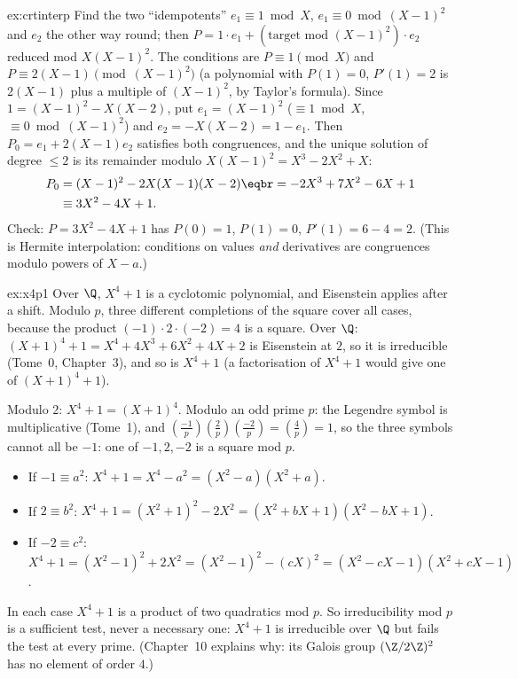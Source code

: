 \begin{solution}{ex:crtinterp}
\idea Find the two ``idempotents'' $e_1\equiv1\bmod X$, $e_1\equiv0\bmod(X-1)^2$ and $e_2$ the other way round; then $P=1\cdot e_1+(\text{target mod }(X-1)^2)\cdot e_2$ reduced mod $X(X-1)^2$.
\writeup The conditions are $P\equiv1\pmod X$ and $P\equiv2(X-1)\pmod{(X-1)^2}$ (a polynomial with $P(1)=0$, $P'(1)=2$ is $2(X-1)$ plus a multiple of $(X-1)^2$, by Taylor's formula). Since $1=(X-1)^2-X(X-2)$, put $e_1=(X-1)^2$ ($\equiv1\bmod X$, $\equiv0\bmod(X-1)^2$) and $e_2=-X(X-2)=1-e_1$. Then $P_0=e_1+2(X-1)e_2$ satisfies both congruences, and the unique solution of degree $\le2$ is its remainder modulo $X(X-1)^2=X^3-2X^2+X$:
\[
\begin{aligned}P_0&=(X-1)^2-2X(X-1)(X-2)\eqbr=-2X^3+7X^2-6X+1\\&\equiv3X^2-4X+1.\end{aligned}
\]
Check: $P=3X^2-4X+1$ has $P(0)=1$, $P(1)=0$, $P'(1)=6-4=2$. (This is Hermite interpolation: conditions on values \emph{and} derivatives are congruences modulo powers of $X-a$.)
\end{solution}

\begin{solution}{ex:x4p1}
\idea Over $\Q$, $X^4+1$ is a cyclotomic polynomial, and Eisenstein applies after a shift. Modulo $p$, three different completions of the square cover all cases, because the product $(-1)\cdot2\cdot(-2)=4$ is a square.
\writeup Over $\Q$: $(X+1)^4+1=X^4+4X^3+6X^2+4X+2$ is Eisenstein at $2$, so it is irreducible (Tome~0, Chapter~3), and so is $X^4+1$ (a factorisation of $X^4+1$ would give one of $(X+1)^4+1$).

Modulo $2$: $X^4+1=(X+1)^4$. Modulo an odd prime $p$: the Legendre symbol is multiplicative (Tome~1), and $\left(\frac{-1}p\right)\left(\frac2p\right)\left(\frac{-2}p\right)=\left(\frac4p\right)=1$, so the three symbols cannot all be $-1$: one of $-1,2,-2$ is a square mod $p$.
\begin{itemize}
\item If $-1\equiv a^2$: $X^4+1=X^4-a^2=(X^2-a)(X^2+a)$.
\item If $2\equiv b^2$: $X^4+1=(X^2+1)^2-2X^2=(X^2+bX+1)(X^2-bX+1)$.
\item If $-2\equiv c^2$: $X^4+1=(X^2-1)^2+2X^2=(X^2-1)^2-(cX)^2=(X^2-cX-1)(X^2+cX-1)$.
\end{itemize}
In each case $X^4+1$ is a product of two quadratics mod $p$. So irreducibility mod $p$ is a sufficient test, never a necessary one: $X^4+1$ is irreducible over $\Q$ but fails the test at every prime. (Chapter~10 explains why: its Galois group $(\Z/2\Z)^2$ has no element of order $4$.)
\end{solution}

